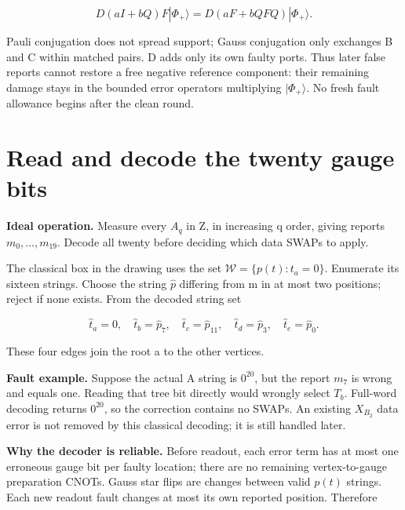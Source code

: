 \documentclass[11pt]{article}
\begin{document}
\[
D(aI+bQ)F|\Phi_+\rangle=D(aF+bQFQ)|\Phi_+\rangle.
\]

Pauli conjugation does not spread support; Gauss conjugation only exchanges B and C within matched pairs. D adds only its own faulty ports. Thus later false reports cannot restore a free negative reference component: their remaining damage stays in the bounded error operators multiplying \(|\Phi_+\rangle\). No fresh fault allowance begins after the clean round.

\section{Read and decode the twenty gauge bits}
\textbf{Ideal operation.} Measure every \(A_q\) in Z, in increasing q order, giving reports \(m_0,\ldots,m_{19}\). Decode all twenty before deciding which data SWAPs to apply.

\begin{center}\begin{minipage}{\linewidth}

\end{minipage}\end{center}

The classical box in the drawing uses the set \(\mathcal W=\{p(t):t_a=0\}\). Enumerate its sixteen strings. Choose the string \(\widehat p\) differing from m in at most two positions; reject if none exists. From the decoded string set

\[
\widehat t_a=0,\quad \widehat t_b=\widehat p_7,\quad
\widehat t_c=\widehat p_{11},\quad
\widehat t_d=\widehat p_3,\quad \widehat t_e=\widehat p_0.
\]

These four edges join the root a to the other vertices.

\textbf{Fault example.} Suppose the actual A string is \(0^{20}\), but the report \(m_7\) is wrong and equals one. Reading that tree bit directly would wrongly select \(T_b\). Full-word decoding returns \(0^{20}\), so the correction contains no SWAPs. An existing \(X_{B_2}\) data error is not removed by this classical decoding; it is still handled later.

\textbf{Why the decoder is reliable.} Before readout, each error term has at most one erroneous gauge bit per faulty location; there are no remaining vertex-to-gauge preparation CNOTs. Gauss star flips are changes between valid \(p(t)\) strings. Each new readout fault changes at most its own reported position. Therefore
\end{document}
